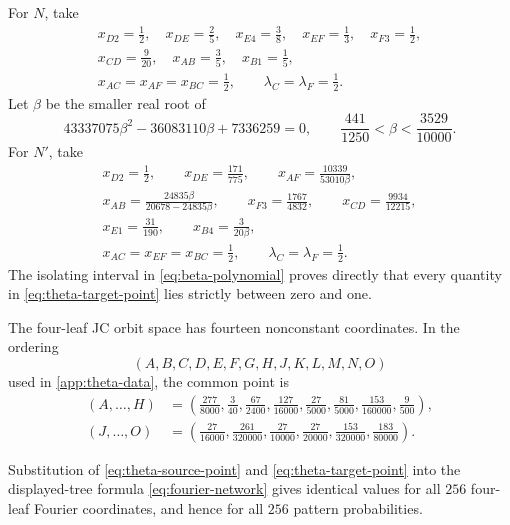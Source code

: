 For $N$, take
\begin{equation}\label{eq:theta-source-point}
\begin{gathered}
 x_{D2}=\frac12,\quad x_{DE}=\frac25,\quad x_{E4}=\frac38,
 \quad x_{EF}=\frac13,\quad x_{F3}=\frac12,\\
 x_{CD}=\frac9{20},\quad x_{AB}=\frac35,\quad x_{B1}=\frac15,\\
 x_{AC}=x_{AF}=x_{BC}=\frac12,
 \qquad \lambda_C=\lambda_F=\frac12.
\end{gathered}
\end{equation}
Let $\beta$ be the smaller real root of
\begin{equation}\label{eq:beta-polynomial}
43337075\beta^2-36083110\beta+7336259=0,
\qquad
\frac{441}{1250}<\beta<\frac{3529}{10000}.
\end{equation}
For $N'$, take
\begin{equation}\label{eq:theta-target-point}
\begin{gathered}
 x_{D2}=\frac12,\qquad x_{DE}=\frac{171}{775},\qquad
 x_{AF}=\frac{10339}{53010\beta},\\
 x_{AB}=\frac{24835\beta}{20678-24835\beta},\qquad
 x_{F3}=\frac{1767}{4832},\qquad x_{CD}=\frac{9934}{12215},\\
 x_{E1}=\frac{31}{190},\qquad x_{B4}=\frac{3}{20\beta},\\
 x_{AC}=x_{EF}=x_{BC}=\frac12,
 \qquad \lambda_C=\lambda_F=\frac12.
\end{gathered}
\end{equation}
The isolating interval in \eqref{eq:beta-polynomial} proves directly that every quantity in \eqref{eq:theta-target-point} lies strictly between zero and one.

The four-leaf JC orbit space has fourteen nonconstant coordinates.  In the ordering
\[
(A,B,C,D,E,F,G,H,J,K,L,M,N,O)
\]
used in \cref{app:theta-data}, the common point is
\begin{align}
(A,\ldots,H)&=
\left(
\frac{277}{8000},\frac3{40},\frac{67}{2400},\frac{127}{16000},
\frac{27}{5000},\frac{81}{5000},\frac{153}{160000},\frac9{500}
\right),\label{eq:theta-common-first}\\
(J,\ldots,O)&=
\left(
\frac{27}{16000},\frac{261}{320000},\frac{27}{10000},
\frac{27}{20000},\frac{153}{320000},\frac{183}{80000}
\right).\label{eq:theta-common-second}
\end{align}

\begin{proposition}\label{prop:theta-equality}
Substitution of \eqref{eq:theta-source-point} and \eqref{eq:theta-target-point} into the displayed-tree formula \eqref{eq:fourier-network} gives identical values for all $256$ four-leaf Fourier coordinates, and hence for all $256$ pattern probabilities.
\end{proposition}

